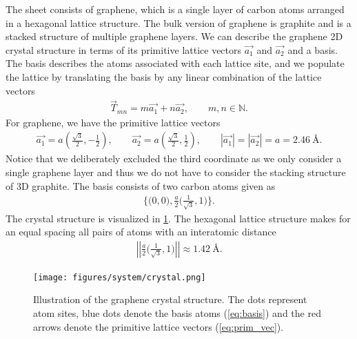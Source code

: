 The sheet consists of graphene, which is a single layer of carbon atoms arranged in a hexagonal lattice structure. The bulk version of graphene is graphite and is a stacked structure of multiple graphene layers. We can describe the graphene 2D crystal structure in terms of its primitive lattice vectors $\vec{a_1}$ and $\vec{a_2}$ and a basis. The basis describes the atoms associated with each lattice site, and we populate the lattice by translating the basis by any linear combination of the lattice vectors 
\begin{align*}
  \vec{T}_{mn} = m\vec{a_1} + n\vec{a_2}, \qquad m,n \in \mathbb{N}.
\end{align*}
For graphene, we have the primitive lattice vectors~\cite{gray2009crystal} 
\begin{align}
  \vec{a_1} = a \left(\frac{\sqrt{3}}{2}, -\frac{1}{2}\right), \qquad \vec{a_2} = a \left(\frac{\sqrt{3}}{2}, \frac{1}{2}\right), \qquad |\vec{a_1}| = |\vec{a_2}| = a = 2.46 \ \text{Å}.
  \label{eq:prim_vec}
\end{align}
Notice that we deliberately excluded the third coordinate as we only consider a
single graphene layer and thus we do not have to consider the stacking structure of 3D graphite. The basis consists of two carbon atoms given as 
\begin{align}
  \Big\{\Big(0,0\Big), \frac{a}{2}\Big(\frac{1}{\sqrt{3}}, 1 \Big) \Big\}.
  \label{eq:basis}
\end{align}
The crystal structure is visualized in \cref{fig:graphene_crystal}. The hexagonal lattice structure makes for an equal spacing all pairs of atoms with an interatomic distance
\begin{align*}
  \left|\left|\frac{a}{2}\Big(\frac{1}{\sqrt{3}}, 1 \Big)\right|\right| \approx 1.42 \ \text{Å}.
\end{align*}


\begin{figure}[h]
  \centering
  \texttt{[image: figures/system/crystal.png]}
  \caption{Illustration of the graphene crystal structure. The dots represent atom sites, blue dots denote the basis atoms (\cref{eq:basis}) and the red arrows denote the primitive lattice vectors (\cref{eq:prim_vec}). }
  \label{fig:graphene_crystal}
\end{figure}



